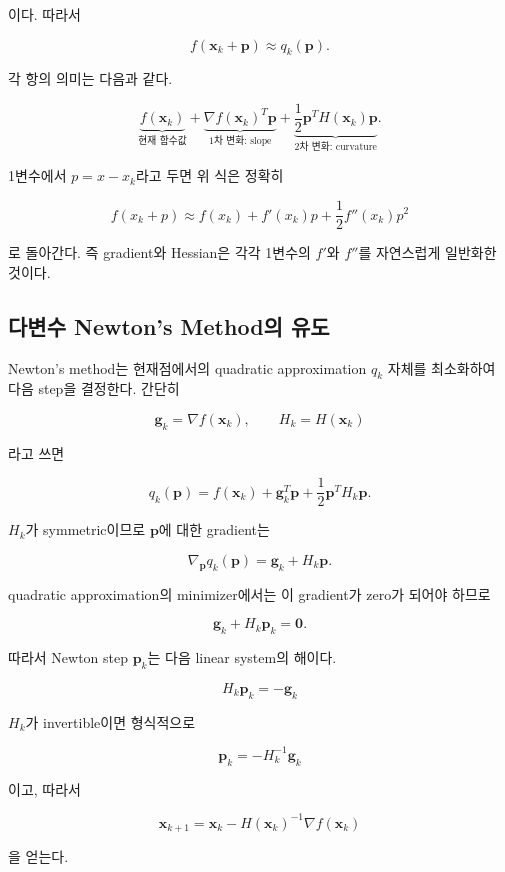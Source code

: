 \documentclass[11pt,a4paper]{article}
\begin{document}
이다. 따라서

\[
    f(\mathbf{x}_k+\mathbf{p})
    \approx
    q_k(\mathbf{p}).
\]

각 항의 의미는 다음과 같다.

\[
\underbrace{f(\mathbf{x}_k)}_{\text{현재 함수값}}
+
\underbrace{\nabla f(\mathbf{x}_k)^T\mathbf{p}}_{\text{1차 변화: slope}}
+
\underbrace{\frac12\mathbf{p}^T H(\mathbf{x}_k)\mathbf{p}}_{\text{2차 변화: curvature}}.
\]

1변수에서 $p=x-x_k$라고 두면 위 식은 정확히

\[
    f(x_k+p)
    \approx
    f(x_k)+f'(x_k)p+\frac12f''(x_k)p^2
\]

로 돌아간다. 즉 gradient와 Hessian은 각각 1변수의 $f'$와 $f''$를
자연스럽게 일반화한 것이다.


\subsection{다변수 Newton's Method의 유도}

Newton's method는 현재점에서의 quadratic approximation $q_k$ 자체를
최소화하여 다음 step을 결정한다. 간단히

\[
    \mathbf{g}_k=\nabla f(\mathbf{x}_k),
    \qquad
    H_k=H(\mathbf{x}_k)
\]

라고 쓰면

\[
    q_k(\mathbf{p})
    =
    f(\mathbf{x}_k)
    +
    \mathbf{g}_k^T\mathbf{p}
    +
    \frac12\mathbf{p}^T H_k\mathbf{p}.
\]

$H_k$가 symmetric이므로 $\mathbf{p}$에 대한 gradient는

\[
    \nabla_{\mathbf{p}}q_k(\mathbf{p})
    =
    \mathbf{g}_k+H_k\mathbf{p}.
\]

quadratic approximation의 minimizer에서는 이 gradient가 zero가 되어야 하므로

\[
    \mathbf{g}_k+H_k\mathbf{p}_k=\mathbf{0}.
\]

따라서 Newton step $\mathbf{p}_k$는 다음 linear system의 해이다.

\[
    \boxed{
    H_k\mathbf{p}_k=-\mathbf{g}_k
    }
\]

$H_k$가 invertible이면 형식적으로

\[
    \mathbf{p}_k=-H_k^{-1}\mathbf{g}_k
\]

이고, 따라서

\[
    \boxed{
    \mathbf{x}_{k+1}
    =
    \mathbf{x}_k
    -
    H(\mathbf{x}_k)^{-1}
    \nabla f(\mathbf{x}_k)
    }
\]

을 얻는다.
\end{document}
